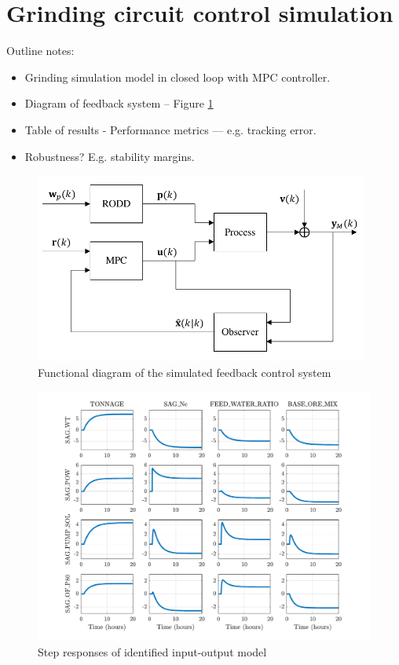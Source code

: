 \section{Grinding circuit control simulation} \label{section:sim-ore-mimo-ctrl} 

Outline notes:
\begin{itemize}
	\item Grinding simulation model in closed loop with \gls{MPC} controller.
	\item Diagram of feedback system – Figure \ref{fig:sim-mpc-diag}
	\item Table of results - Performance metrics — e.g. tracking error.
	\item Robustness?  E.g. stability margins.
\end{itemize}

\begin{figure}[htp]
	\centering
	\includegraphics[width=11cm]{images/sim-mpc-diag.pdf}
	\caption{Functional diagram of the simulated feedback control system}
	\label{fig:sim-mpc-diag}
\end{figure}

\begin{figure}[htp]
	\centering
	\includegraphics[width=15.5cm]{images/mpc4x4_stepresp_matrix.pdf}
	\caption{Step responses of identified input-output model}
	\label{fig:mpc4x4-stepresp-matrix}
\end{figure}

